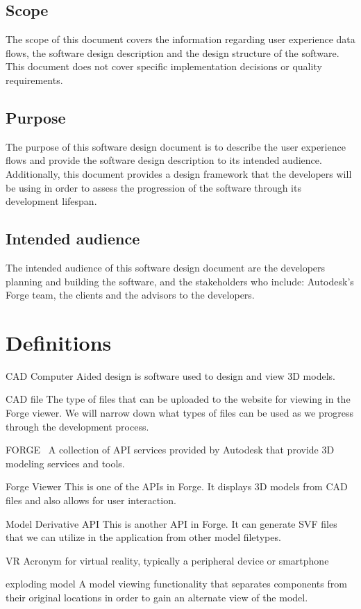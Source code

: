 \documentclass[letterpaper, 10pt, draftclsnofoot, compsoc, onecolumn]{IEEEtran}
\begin{document}
\subsection{Scope}
The scope of this document covers the information regarding user experience data flows, the software design description and the design structure of the software. This document does not cover specific implementation decisions or quality requirements.
\subsection{Purpose}
The purpose of this software design document is to describe the user experience flows and provide the software design description to its intended audience. Additionally, this document provides a design framework that the developers will be using in order to assess the progression of the software through its development lifespan.
\subsection{Intended audience}
The intended audience of this software design document are the developers planning and building the software, and the stakeholders who include: Autodesk's Forge team, the clients and the advisors to the developers.

\section{Definitions}
\begin{description}
	\item{CAD} Computer Aided design is software used to design and view 3D models.

	\item{CAD file} The type of files that can be uploaded to the website for viewing in the Forge viewer. 
	We will  narrow down what types of files can be used as we progress through the development process.

	\item{FORGE}~\cite{forge2016} A collection of API services provided by Autodesk that provide 3D modeling services and tools.

	\item{Forge Viewer} This is one of the APIs in Forge. It displays 3D models from CAD files and also allows
	for user interaction.
	
	\item{Model Derivative API} This is another API in Forge. It can generate SVF files that we can utilize in the application from other model filetypes.
	
	\item{VR} Acronym for virtual reality, typically a peripheral device or smartphone
	\item{exploding model} A model viewing functionality that separates components from their original locations in order to gain an alternate view of the model.
\end{description} 
\end{document}
